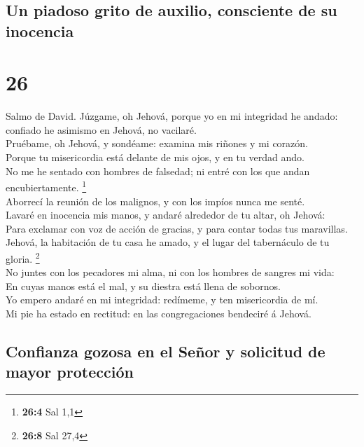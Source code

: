 \hypertarget{un-piadoso-grito-de-auxilio-consciente-de-su-inocencia}{%
\subsection{Un piadoso grito de auxilio, consciente de su
inocencia}\label{un-piadoso-grito-de-auxilio-consciente-de-su-inocencia}}

\hypertarget{section-25}{%
\section{26}\label{section-25}}

 Salmo de David. Júzgame, oh Jehová, porque yo en mi
integridad he andado: confiado he asimismo en Jehová, no vacilaré.\\
 Pruébame, oh Jehová, y sondéame: examina mis riñones y mi
corazón.\\
 Porque tu misericordia está delante de mis ojos, y en tu
verdad ando.\\
 No me he sentado con hombres de falsedad; ni entré con
los que andan encubiertamente. \footnote{\textbf{26:4} Sal 1,1}\\
 Aborrecí la reunión de los malignos, y con los impíos
nunca me senté.\\
 Lavaré en inocencia mis manos, y andaré alrededor de tu
altar, oh Jehová:\\
 Para exclamar con voz de acción de gracias, y para contar
todas tus maravillas.\\
 Jehová, la habitación de tu casa he amado, y el lugar del
tabernáculo de tu gloria. \footnote{\textbf{26:8} Sal 27,4}\\
 No juntes con los pecadores mi alma, ni con los hombres
de sangres mi vida:\\
 En cuyas manos está el mal, y su diestra está llena de
sobornos.\\
 Yo empero andaré en mi integridad: redímeme, y ten
misericordia de mí.\\
 Mi pie ha estado en rectitud: en las congregaciones
bendeciré á Jehová.

\hypertarget{confianza-gozosa-en-el-seuxf1or-y-solicitud-de-mayor-protecciuxf3n}{%
\subsection{Confianza gozosa en el Señor y solicitud de mayor
protección}\label{confianza-gozosa-en-el-seuxf1or-y-solicitud-de-mayor-protecciuxf3n}}

